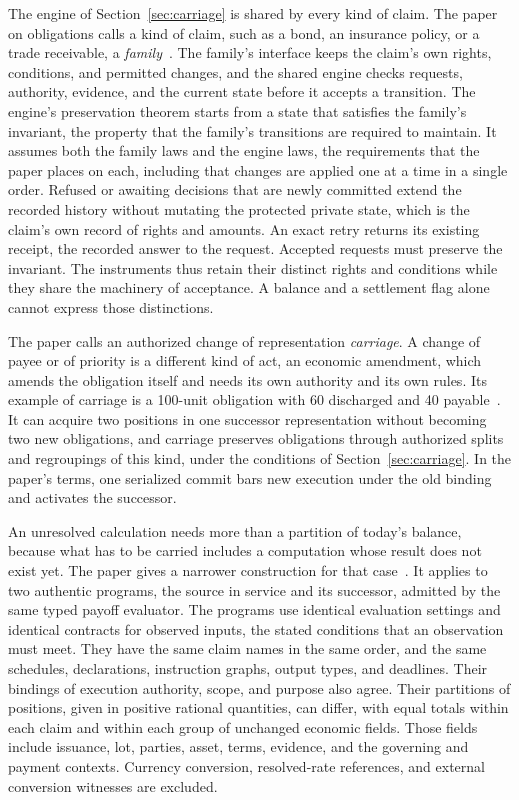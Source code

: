 \documentclass{momentum}
\begin{document}
The engine of Section~\ref{sec:carriage} is shared by every kind of claim. The paper on obligations calls a kind of claim, such as a bond, an insurance policy, or a trade receivable, a \emph{family}~\cite{aot}. The family's interface keeps the claim's own rights, conditions, and permitted changes, and the shared engine checks requests, authority, evidence, and the current state before it accepts a transition. The engine's preservation theorem starts from a state that satisfies the family's invariant, the property that the family's transitions are required to maintain. It assumes both the family laws and the engine laws, the requirements that the paper places on each, including that changes are applied one at a time in a single order. Refused or awaiting decisions that are newly committed extend the recorded history without mutating the protected private state, which is the claim's own record of rights and amounts. An exact retry returns its existing receipt, the recorded answer to the request. Accepted requests must preserve the invariant. The instruments thus retain their distinct rights and conditions while they share the machinery of acceptance. A balance and a settlement flag alone cannot express those distinctions.

The paper calls an authorized change of representation \emph{carriage}. A change of payee or of priority is a different kind of act, an economic amendment, which amends the obligation itself and needs its own authority and its own rules. Its example of carriage is a 100-unit obligation with 60 discharged and 40 payable~\cite[Section~7]{aot}. It can acquire two positions in one successor representation without becoming two new obligations, and carriage preserves obligations through authorized splits and regroupings of this kind, under the conditions of Section~\ref{sec:carriage}. In the paper's terms, one serialized commit bars new execution under the old binding and activates the successor.

An unresolved calculation needs more than a partition of today's balance, because what has to be carried includes a computation whose result does not exist yet. The paper gives a narrower construction for that case~\cite[Section~7.6]{aot}. It applies to two authentic programs, the source in service and its successor, admitted by the same typed payoff evaluator. The programs use identical evaluation settings and identical contracts for observed inputs, the stated conditions that an observation must meet. They have the same claim names in the same order, and the same schedules, declarations, instruction graphs, output types, and deadlines. Their bindings of execution authority, scope, and purpose also agree. Their partitions of positions, given in positive rational quantities, can differ, with equal totals within each claim and within each group of unchanged economic fields. Those fields include issuance, lot, parties, asset, terms, evidence, and the governing and payment contexts. Currency conversion, resolved-rate references, and external conversion witnesses are excluded.
\end{document}
